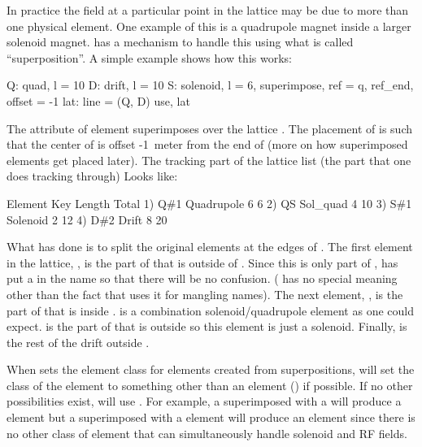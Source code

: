 In practice the field at a particular point in the lattice may be due
to more than one physical element. One example of this is a quadrupole
magnet inside a larger solenoid magnet. \bmad has a mechanism to
handle this using what is called ``superposition''. A
simple example shows how this works:
\begin{example}
  Q: quad, l = 10
  D: drift, l = 10
  S: solenoid, l = 6, superimpose, ref = q, ref_end, offset = -1
  lat: line = (Q, D)
  use, lat
\end{example}
The  attribute of element  superimposes 
over the lattice . The placement of  is such that the
center of  is offset -1~meter from the end of  (more on how
superimposed elements get placed later). The tracking part of the
lattice list (the part that one does tracking through) Looks like:
\begin{example}
        Element   Key         Length  Total     
  1)    Q{\#}1       Quadrupole   6        6
  2)    Q{\B}S       Sol_quad     4       10
  3)    S{\#}1       Solenoid     2       12
  4)    D{\#}2       Drift        8       20
\end{example}
What \bmad has done is to split the original elements  at
the edges of . The first element in the lattice, , is
the part of  that is outside of . Since this is only part
of , \bmad has put a  in the name so that there will be
no confusion. (\vn{\#} has no special meaning other than the fact
that \bmad uses it for mangling names). The next element, ,
is the part of  that is inside .  is a
combination solenoid/quadrupole element as one could
expect.  is the part of  that is outside  so
this element is just a solenoid. Finally,  is the rest of the
drift outside .

When \bmad sets the element class for elements created from
superpositions, \bmad will set the class of the element to something
other than an  element () if
possible. If no other possibilities exist, \bmad will use
. For example, a  superimposed with a
 will produce a  element but a 
superimposed with a  element will produce an
 element since there is no other class of element that
can simultaneously handle solenoid and RF fields.

